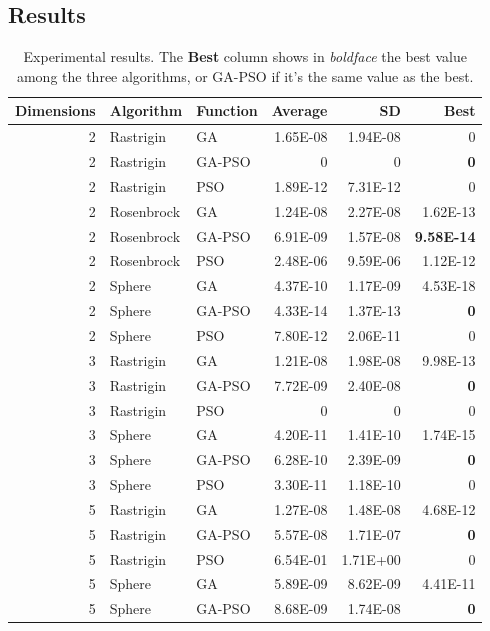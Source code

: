\documentclass[runningheads]{llncs}
\begin{document}
\subsection{Results}
\label{subs:results}
%
\begin{table}[h!tp]
  \caption{Experimental results. The {\bf Best} column shows in {\em
      boldface} the best value among the three algorithms, or GA-PSO
    if it's the same value as the best.}
  \label{table:resultados}
  \centering
\begin{tabular}{rllrrr}
  \hline
Dimensions & Algorithm & Function & Average & SD & Best \\ 
  \hline
   2 & Rastrigin & GA & 1.65E-08 & 1.94E-08 & 0 \\ 
  2 & Rastrigin & GA-PSO & 0 & 0 & {\bf 0} \\ 
  2 & Rastrigin & PSO & 1.89E-12 & 7.31E-12 & 0 \\ 
  2 & Rosenbrock & GA & 1.24E-08 & 2.27E-08 & 1.62E-13 \\ 
  2 & Rosenbrock & GA-PSO & 6.91E-09 & 1.57E-08 & {\bf 9.58E-14} \\ 
  2 & Rosenbrock & PSO & 2.48E-06 & 9.59E-06 & 1.12E-12 \\ 
  2 & Sphere & GA & 4.37E-10 & 1.17E-09 & 4.53E-18 \\ 
  2 & Sphere & GA-PSO & 4.33E-14 & 1.37E-13 & {\bf 0 }\\ 
  2 & Sphere & PSO & 7.80E-12 & 2.06E-11 & 0 \\ 
  3 & Rastrigin & GA & 1.21E-08 & 1.98E-08 & 9.98E-13 \\ 
  3 & Rastrigin & GA-PSO & 7.72E-09 & 2.40E-08 & {\bf 0} \\ 
  3 & Rastrigin & PSO & 0 & 0 & 0 \\ 
  3 & Sphere & GA & 4.20E-11 & 1.41E-10 & 1.74E-15 \\ 
  3 & Sphere & GA-PSO & 6.28E-10 & 2.39E-09 & {\bf 0} \\ 
  3 & Sphere & PSO & 3.30E-11 & 1.18E-10 & 0 \\ 
  5 & Rastrigin & GA & 1.27E-08 & 1.48E-08 & 4.68E-12 \\ 
  5 & Rastrigin & GA-PSO & 5.57E-08 & 1.71E-07 & {\bf 0} \\ 
  5 & Rastrigin & PSO & 6.54E-01 & 1.71E+00 & 0 \\ 
  5 & Sphere & GA & 5.89E-09 & 8.62E-09 & 4.41E-11 \\ 
  5 & Sphere & GA-PSO & 8.68E-09 & 1.74E-08 & {\bf 0} \\ 

\end{tabular}
\end{table}
\end{document}
